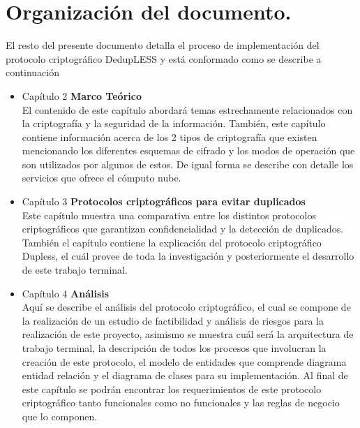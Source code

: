 \section{Organización del documento. }
El resto del presente documento detalla el proceso de implementaci\'on del protocolo criptogr\'afico DedupLESS y est\'a conformado como se describe a continuaci\'on
\begin{itemize}
\item Capítulo 2 \textbf{Marco Teórico} \\
El contenido de este capítulo abordará temas estrechamente relacionados con la criptografía y la seguridad de la información. También, este capítulo contiene información acerca de los 2 tipos de criptografía que existen mencionando los diferentes esquemas de cifrado y los modos de operación que son utilizados por algunos de estos. De igual forma se describe con detalle los servicios que ofrece el cómputo nube. 

\item Capítulo 3 \textbf{Protocolos criptográficos para evitar duplicados} \\
Este cap\'itulo muestra una comparativa entre los distintos protocolos criptogr\'aficos que garantizan confidencialidad y la detecci\'on de duplicados. También el capítulo contiene la explicación del protocolo criptográfico Dupless, el cuál provee de toda la investigación y posteriormente el desarrollo de este trabajo terminal.

\item Capítulo 4 \textbf{Análisis} \\
Aqu\'i se describe el análisis del protocolo criptográfico, el cual se compone de la realización de un estudio de factibilidad y análisis de riesgos para la realización de este proyecto, asimismo se muestra cuál será la arquitectura de trabajo terminal, la descripción de todos los procesos que involucran la creación de este protocolo, el modelo de entidades que comprende diagrama entidad relación y el diagrama de clases para su implementación. Al final de este capítulo se podrán encontrar los requerimientos de este protocolo criptográfico tanto funcionales como no funcionales y las reglas de negocio que lo componen.


\end{itemize}
